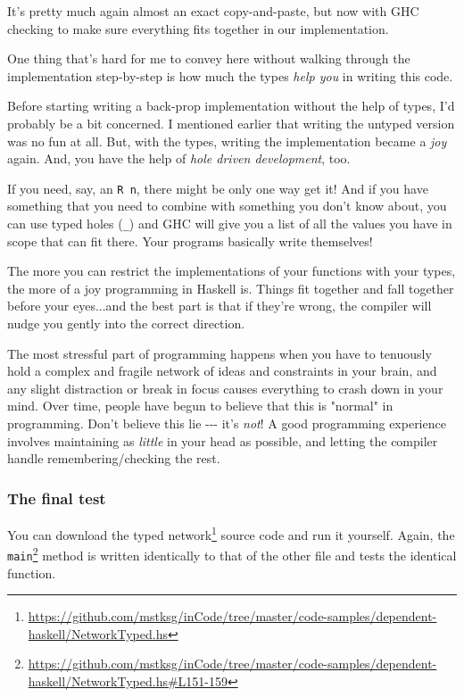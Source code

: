 \documentclass[]{article}
\renewcommand{\href}[2]{#2\footnote{\url{#1}}}
\begin{document}
It's pretty much again almost an exact copy-and-paste, but now with GHC checking
to make sure everything fits together in our implementation.

One thing that's hard for me to convey here without walking through the
implementation step-by-step is how much the types \emph{help you} in writing
this code.

Before starting writing a back-prop implementation without the help of types,
I'd probably be a bit concerned. I mentioned earlier that writing the untyped
version was no fun at all. But, with the types, writing the implementation
became a \emph{joy} again. And, you have the help of \emph{hole driven
development}, too.

If you need, say, an \texttt{R\ n}, there might be only one way get it! And if
you have something that you need to combine with something you don't know about,
you can use typed holes (\texttt{\_}) and GHC will give you a list of all the
values you have in scope that can fit there. Your programs basically write
themselves!

The more you can restrict the implementations of your functions with your types,
the more of a joy programming in Haskell is. Things fit together and fall
together before your eyes...and the best part is that if they're wrong, the
compiler will nudge you gently into the correct direction.

The most stressful part of programming happens when you have to tenuously hold a
complex and fragile network of ideas and constraints in your brain, and any
slight distraction or break in focus causes everything to crash down in your
mind. Over time, people have begun to believe that this is "normal" in
programming. Don't believe this lie -\/-\/- it's \emph{not}! A good programming
experience involves maintaining as \emph{little} in your head as possible, and
letting the compiler handle remembering/checking the rest.

\subsubsection{The final test}

You can download the
\href{https://github.com/mstksg/inCode/tree/master/code-samples/dependent-haskell/NetworkTyped.hs}{typed
network} source code and run it yourself. Again, the
\href{https://github.com/mstksg/inCode/tree/master/code-samples/dependent-haskell/NetworkTyped.hs\#L151-159}{\texttt{main}}
method is written identically to that of the other file and tests the identical
function.
\end{document}
